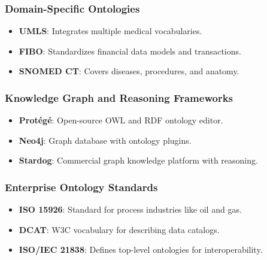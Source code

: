 \begin{frame}[fragile]\frametitle{Domain-Specific Ontologies}
    \begin{itemize}
        \item \textbf{UMLS}: Integrates multiple medical vocabularies.
        \item \textbf{FIBO}: Standardizes financial data models and transactions.
        \item \textbf{SNOMED CT}: Covers diseases, procedures, and anatomy.
    \end{itemize}
\end{frame}

\begin{frame}[fragile]\frametitle{Knowledge Graph and Reasoning Frameworks}
    \begin{itemize}
        \item \textbf{Protégé}: Open-source OWL and RDF ontology editor.
        \item \textbf{Neo4j}: Graph database with ontology plugins.
        \item \textbf{Stardog}: Commercial graph knowledge platform with reasoning.
    \end{itemize}
\end{frame}

\begin{frame}[fragile]\frametitle{Enterprise Ontology Standards}
    \begin{itemize}
        \item \textbf{ISO 15926}: Standard for process industries like oil and gas.
        \item \textbf{DCAT}: W3C vocabulary for describing data catalogs.
        \item \textbf{ISO/IEC 21838}: Defines top-level ontologies for interoperability.
    \end{itemize}
\end{frame}

